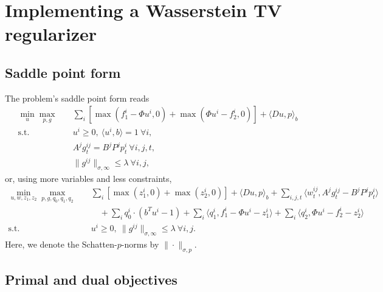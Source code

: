 
\section{Implementing a Wasserstein TV regularizer}

\subsection{Saddle point form}

The problem's saddle point form reads
\begin{align*}
    \min_{u} \max_{p,g} \quad
        & \sum_i \left[
            \max(f_1^i - \Phi u^i, 0) + \max(\Phi u^i - f_2^i, 0)
          \right] + \langle Du, p \rangle_b \\
    \text{s.t.}\quad 
        & u^i \geq 0, ~\langle u^i, b \rangle = 1 ~\forall i, \\
        & A^j g^{ij}_t = B^j P^j p^i_t ~\forall i,j,t, \\
        & \|g^{ij}\|_{\sigma,\infty} \leq \lambda ~\forall i,j,
\end{align*}
or, using more variables and less constraints,
\begin{align*}
    \min_{u, w, z_1, z_2} \max_{p,g,q_0,q_1,q_2} \quad
        & \sum_i \left[ \max(z_1^i, 0) + \max(z_2^i, 0) \right]
            + \langle Du, p \rangle_b
            + \sum_{i,j,t} \langle w^{ij}_t, A^j g^{ij}_t - B^j P^j p^i_t \rangle
            \\
        &\quad + \sum_{i} q_0^i \cdot (b^T u^i - 1)
            + \sum_{i} \langle q_1^i, f_1^i - \Phi u^i - z_1^i \rangle
            + \sum_{i} \langle q_2^i, \Phi u^i - f_2^i - z_2^i \rangle
            \\
    \text{s.t.}\quad 
        & u^i \geq 0,
         ~\|g^{ij}\|_{\sigma,\infty} \leq \lambda ~\forall i,j.
\end{align*}
Here, we denote the Schatten-$p$-norms by $\|\cdot\|_{\sigma,p}$.

\subsection{Primal and dual objectives}

